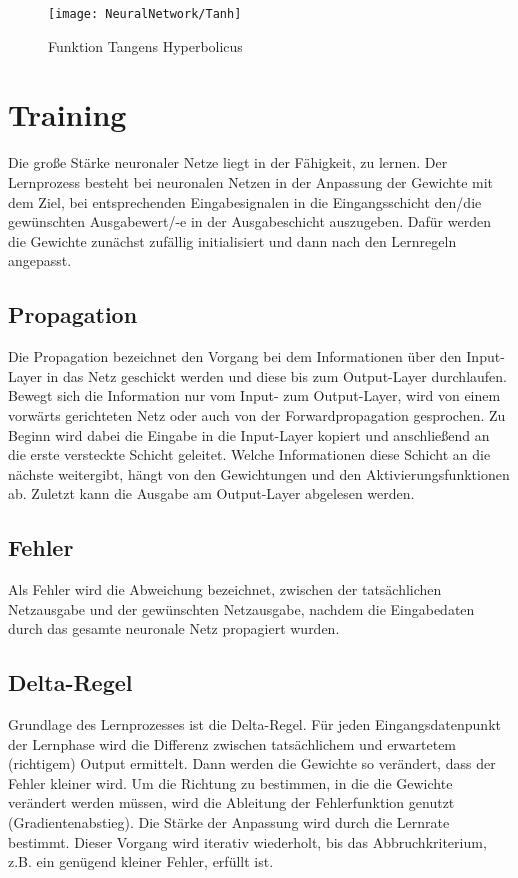 \begin{figure}[H]
	\begin{center}
	\texttt{[image: NeuralNetwork/Tanh]}
	\caption{Funktion Tangens Hyperbolicus}\label{NNTanh}
	\end{center}
\end{figure}

	
	

\section{Training}%
Die große Stärke neuronaler Netze liegt in der Fähigkeit, zu lernen. Der Lernprozess besteht bei neuronalen Netzen in der Anpassung 
der Gewichte mit dem Ziel, bei entsprechenden Eingabesignalen in die Eingangsschicht den/die gewünschten Ausgabewert/-e in der 
Ausgabeschicht auszugeben. Dafür werden die Gewichte zunächst zufällig initialisiert und dann nach den Lernregeln angepasst.\\


\subsection{Propagation}

Die Propagation bezeichnet den Vorgang bei dem Informationen über den Input-Layer in
das Netz geschickt werden und diese bis zum Output-Layer durchlaufen. Bewegt sich die
Information nur vom Input- zum Output-Layer, wird von einem vorwärts gerichteten Netz
oder auch von der Forwardpropagation gesprochen. Zu Beginn wird dabei die Eingabe in
die Input-Layer kopiert und anschließend an die erste versteckte Schicht geleitet. Welche
Informationen diese Schicht an die nächste weitergibt, hängt von den Gewichtungen und
den Aktivierungsfunktionen ab. Zuletzt kann die Ausgabe am Output-Layer abgelesen
werden. \cite{Kriesel:2008}


\subsection{Fehler}

Als Fehler wird die Abweichung bezeichnet, zwischen der tatsächlichen Netzausgabe und
der gewünschten Netzausgabe, nachdem die Eingabedaten durch das gesamte neuronale
Netz propagiert wurden. \cite{Kriesel:2008}


\subsection{Delta-Regel} 
Grundlage des Lernprozesses ist die Delta-Regel. Für jeden Eingangsdatenpunkt der Lernphase wird die Differenz zwischen 
tatsächlichem und erwartetem (richtigem) Output ermittelt. Dann werden die Gewichte so verändert, dass der Fehler kleiner 
wird. Um die Richtung zu bestimmen, in die die Gewichte verändert werden müssen, wird die Ableitung der Fehlerfunktion 
genutzt (Gradientenabstieg). Die Stärke der Anpassung wird durch die Lernrate bestimmt. Dieser Vorgang wird iterativ wiederholt, 
bis das Abbruchkriterium, z.B. ein genügend kleiner Fehler, erfüllt ist.\cite{Kononenko:2007}\\

